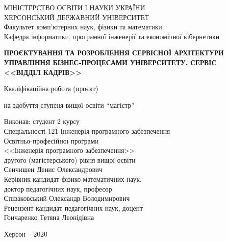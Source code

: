 
\begin{titlepage}
 \renewcommand\baselinestretch{0.75}\normalsize
 \renewcommand\baselinestretch{1.25}\normalsize
 \begin{center}
  {\selectfont МІНІСТЕРСТВО ОСВІТИ І НАУКИ УКРАЇНИ \\ ХЕРСОНСЬКИЙ ДЕРЖАВНИЙ УНІВЕРСИТЕТ}
  \\ Факультет комп’ютерних наук, фізики та математики
  \\ Кафедра інформатики, програмної інженерії та економічної кібернетики
 \end{center}  
  \begin{flushright}
 \end{flushright}
\vspace{1.0cm}
\begin{center}

 {\MakeUppercase{\textbf{Проєктування та розроблення сервісної архітектури управління бізнес-процесами університету. Сервіс <<Відділ кадрів>>}}\par}
 
 \vspace{1.0cm}
 
 Кваліфікаційна робота (проєкт)
 
на здобуття ступеня вищої освіти “магістр”
\end{center}
\vspace{0.5cm}

\hfill\parbox{10cm}{
\begin{flushleft}
Виконав: студент 2 курсу\\
Спеціальності 121 Інженерія програмного
забезпечення\\
Освітньо-професійної програми\\
<<Інженерія програмного забезпечення>>\\
другого (магістерського) рівня вищої освіти\\
Сенчишен Денис Олександрович\\
Керівник кандидат фізико-математичних наук,\\
доктор педагогічних наук, професор\\
Співаковський Олександр Володимирович\\
Рецензент кандидат педагогічних наук, доцент\\
Гончаренко Тетяна Леонідівна
\end{flushleft}}

\vfill
\begin{center}
Херсон -- 2020
\end{center}
\end{titlepage}

\renewcommand{\baselinestretch}{1.5}

\thispagestyle{empty}
\setcounter{page}{2}

